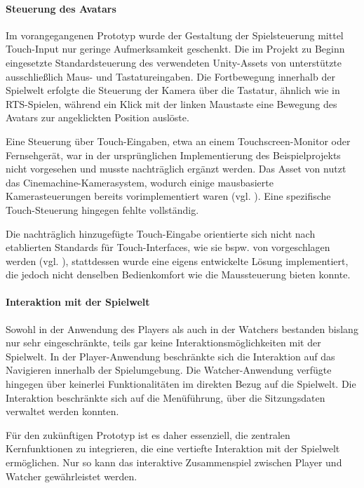 \paragraph{Steuerung des Avatars}

Im vorangegangenen Prototyp wurde der Gestaltung der Spielsteuerung mittel Touch-Input nur geringe Aufmerksamkeit geschenkt. Die im Projekt zu Beginn eingesetzte Standardsteuerung des verwendeten Unity-Assets von \cite{alasl_autolevel_2022} unterstützte ausschließlich Maus- und Tastatureingaben. Die Fortbewegung innerhalb der Spielwelt erfolgte die Steuerung der Kamera über die Tastatur, ähnlich wie in \ac{RTS}-Spielen, während ein Klick mit der linken Maustaste eine Bewegung des Avatars zur angeklickten Position auslöste.

Eine Steuerung über Touch-Eingaben, etwa an einem Touchscreen-Monitor oder Fernsehgerät, war in der ursprünglichen Implementierung des Beispielprojekts nicht vorgesehen und musste nachträglich ergänzt werden. Das Asset von \cite{alasl_autolevel_2022} nutzt das Cinemachine-Kamerasystem, wodurch einige mausbasierte Kamerasteuerungen bereits vorimplementiert waren (vgl. \citealp{unity_technologies_about_2017}). Eine spezifische Touch-Steuerung hingegen fehlte vollständig.

Die nachträglich hinzugefügte Touch-Eingabe orientierte sich nicht nach etablierten Standards für Touch-Interfaces, wie sie bspw. von \cite{reinhard_augmented_2022} vorgeschlagen werden (vgl. \citealp[S. 64ff]{reinhard_augmented_2022}),
stattdessen wurde eine eigens entwickelte Lösung implementiert, die jedoch nicht denselben Bedienkomfort wie die Maussteuerung bieten konnte.

\paragraph{Interaktion mit der Spielwelt}

Sowohl in der Anwendung des Players als auch in der Watchers bestanden bislang nur sehr eingeschränkte, teils gar keine Interaktionsmöglichkeiten mit der Spielwelt. In der Player-Anwendung beschränkte sich die Interaktion auf das Navigieren innerhalb der Spielumgebung. Die Watcher-Anwendung verfügte hingegen über keinerlei Funktionalitäten im direkten Bezug auf die Spielwelt. Die Interaktion beschränkte sich auf die Menüführung, über die Sitzungsdaten verwaltet werden konnten.

Für den zukünftigen Prototyp ist es daher essenziell, die zentralen Kernfunktionen zu integrieren, die eine vertiefte Interaktion mit der Spielwelt ermöglichen. Nur so kann das interaktive Zusammenspiel zwischen Player und Watcher gewährleistet werden.

